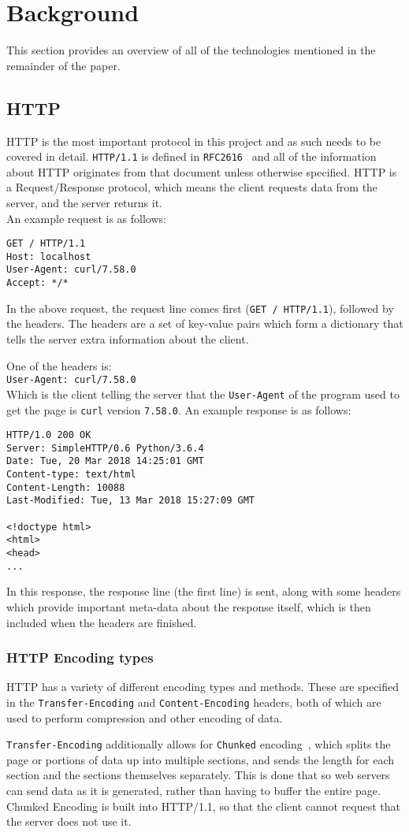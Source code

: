 \section{Background}
This section provides an overview of all of the technologies mentioned in the remainder of the paper.
\subsection{HTTP}
HTTP is the most important protocol in this project and as such needs to be covered in detail.
\texttt{HTTP/1.1} is defined in \texttt{RFC2616}~\cite{rfc2616} and all of the information about HTTP originates from that document unless otherwise specified.
HTTP is a Request/Response protocol, which means the client requests data from the server, and the server returns it.\\
An example request is as follows:
\begin{verbatim}
GET / HTTP/1.1
Host: localhost
User-Agent: curl/7.58.0
Accept: */*
\end{verbatim}
In the above request, the request line comes first (\texttt{GET / HTTP/1.1}), followed by the headers. The headers are a set of key-value pairs which form a dictionary that tells the server extra information about the client.

One of the headers is:\\
\texttt{User-Agent: curl/7.58.0}\\
Which is the client telling the server that the \texttt{User-Agent} of the program used to get the page is \texttt{curl} version \texttt{7.58.0}.\vspace{0.4cm}\newline
An example response is as follows:
\begin{verbatim}
HTTP/1.0 200 OK
Server: SimpleHTTP/0.6 Python/3.6.4
Date: Tue, 20 Mar 2018 14:25:01 GMT
Content-type: text/html
Content-Length: 10088
Last-Modified: Tue, 13 Mar 2018 15:27:09 GMT

<!doctype html>
<html>
<head>
...
\end{verbatim}
In this response, the response line (the first line) is sent, along with some headers which provide important meta-data about the response itself, which is then included when the headers are finished.

\subsubsection{HTTP Encoding types}
HTTP has a variety of different encoding types and methods.
These are specified in the \texttt{Transfer-Encoding} and \texttt{Content-Encoding} headers, both of which are  used to perform compression and other encoding of data.\par
\texttt{Transfer-Encoding} additionally allows for \texttt{Chunked} encoding~\cite{rfc7230}, which splits the page or portions of data up into multiple sections, and sends the length for each section and the sections themselves separately. This is done that so web servers can send data as it is generated, rather than having to buffer the entire page. Chunked Encoding is built into HTTP/1.1, so that the client cannot request that the server does not use it.

